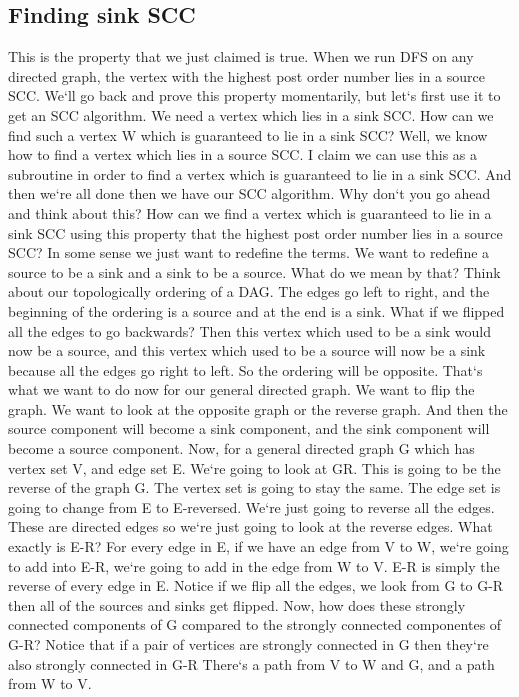 \subsection{Finding sink SCC}
This is the property that we just claimed is true.
When we run DFS on any directed graph, the vertex with the highest post order number lies in a source SCC\@.
We`ll go back and prove this property momentarily, but let`s first use it to get an SCC algorithm.
We need a vertex which lies in a sink SCC\@.
How can we find such a vertex W which is guaranteed to lie in a sink SCC? Well, we know how to find a vertex which lies in a source SCC\@.
I claim we can use this as a subroutine in order to find a vertex which is guaranteed to lie in a sink SCC\@.
And then we`re all done then we have our SCC algorithm.
Why don`t you go ahead and think about this? How can we find a vertex which is guaranteed to lie in a sink SCC using this property that the highest post order number lies in a source SCC? In some sense we just want to redefine the terms.
We want to redefine a source to be a sink and a sink to be a source.
What do we mean by that? Think about our topologically ordering of a DAG\@.
The edges go left to right, and the beginning of the ordering is a source and at the end is a sink.
What if we flipped all the edges to go backwards? Then this vertex which used to be a sink would now be a source, and this vertex which used to be a source will now be a sink because all the edges go right to left.
So the ordering will be opposite.
That`s what we want to do now for our general directed graph.
We want to flip the graph.
We want to look at the opposite graph or the reverse graph.
And then the source component will become a sink component, and the sink component will become a source component.
Now, for a general directed graph G which has vertex set V, and edge set E\@.
We`re going to look at GR\@.
This is going to be the reverse of the graph G\@.
The vertex set is going to stay the same.
The edge set is going to change from E to E-reversed.
We`re just going to reverse all the edges.
These are directed edges so we`re just going to look at the reverse edges.
What exactly is E-R? For every edge in E, if we have an edge from V to W, we`re going to add into E-R, we`re going to add in the edge from W to V\@.
E-R is simply the reverse of every edge in E\@.
Notice if we flip all the edges, we look from G to G-R then all of the sources and sinks get flipped.
Now, how does these strongly connected components of G compared to the strongly connected componentes of G-R? Notice that if a pair of vertices are strongly connected in G then they`re also strongly connected in G-R There`s a path from V to W and G, and a path from W to V\@.
